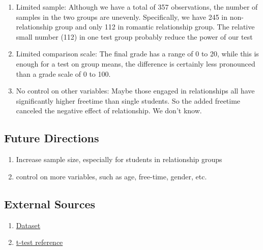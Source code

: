 \documentclass[]{article}
\providecommand{\tightlist}{%
  \setlength{\itemsep}{0pt}\setlength{\parskip}{0pt}}
\begin{document}
\begin{enumerate}
\def\labelenumi{\arabic{enumi}.}
\item
  Limited sample: Although we have a total of 357 observations, the
  number of samples in the two groups are unevenly. Specifically, we
  have 245 in non-relationship group and only 112 in romantic
  relationship group. The relative small number (112) in one test group
  probably reduce the power of our test
\item
  Limited comparison scale: The final grade has a range of 0 to 20,
  while this is enough for a test on group means, the difference is
  certainly less pronounced than a grade scale of 0 to 100.
\item
  No control on other variables: Maybe those engaged in relationships
  all have significantly higher freetime than single students. So the
  added freetime canceled the negative effect of relationship. We don't
  know.
\end{enumerate}

\subsection{Future Directions}\label{future-directions}

\begin{enumerate}
\def\labelenumi{\arabic{enumi}.}
\tightlist
\item
  Increase sample size, especially for students in relationship groups
\item
  control on more variables, such as age, free-time, gender, etc.
\end{enumerate}

\subsection{External Sources}\label{external-sources}

\begin{enumerate}
\def\labelenumi{\arabic{enumi}.}
\tightlist
\item
  \href{https://archive.ics.uci.edu/ml/datasets/Student+Performance}{Dataset}
\item
  \href{https://en.wikipedia.org/wiki/Welch\%27s_t-test}{t-test
  reference}
\end{enumerate}
\end{document}
